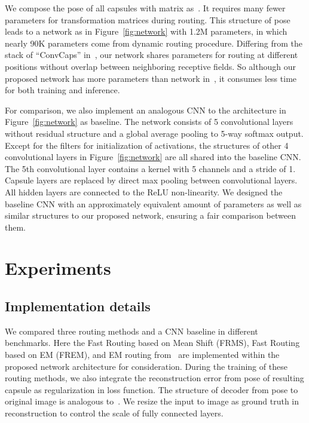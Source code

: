\documentclass[runningheads]{llncs}
\begin{document}
We compose the pose of all capsules with  matrix as~\cite{hinton2018emrouting}. It requires many fewer parameters for transformation matrices during routing. This structure of pose leads to a network as in Figure~\ref{fig:network} with 1.2M parameters, in which nearly 90K parameters come from dynamic routing procedure. Differing from the stack of ``ConvCaps'' in~\cite{hinton2018emrouting}, our network shares parameters for routing at different positions without overlap between neighboring receptive fields. So although our proposed network has more parameters than network in~\cite{hinton2018emrouting}, it consumes less time for both training and inference.

For comparison, we also implement an analogous CNN to the architecture in Figure~\ref{fig:network} as baseline. The network consists of 5 convolutional layers without residual structure and a global average pooling to 5-way softmax output. Except for the  filters for initialization of activations, the structures of other 4 convolutional layers in Figure~\ref{fig:network} are all shared into the baseline CNN. The 5th convolutional layer contains a  kernel with 5 channels and a stride of 1. Capsule layers are replaced by direct max pooling between convolutional layers. All hidden layers are connected to the ReLU non-linearity. We designed the baseline CNN with an approximately equivalent amount of parameters as well as similar structures to our proposed network, ensuring a fair comparison between them.

\section{Experiments}
\subsection{Implementation details}
We compared three routing methods and a CNN baseline in different benchmarks. Here the Fast Routing based on Mean Shift (FRMS), Fast Routing based on EM (FREM), and EM routing from~\cite{hinton2018emrouting} are implemented within the proposed network architecture for consideration. During the training of these routing methods, we also integrate the reconstruction error from pose of resulting capsule as regularization in loss function. The structure of decoder from pose to original image is analogous to~\cite{sabour2017dynamic}. We resize the input to  image as ground truth in reconstruction to control the scale of fully connected layers.
\end{document}
